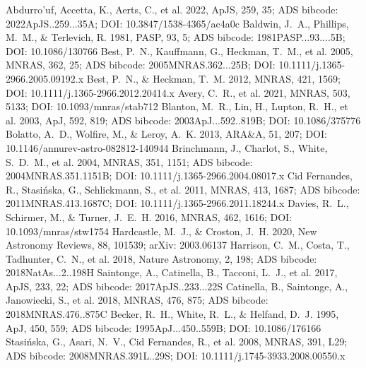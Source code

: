 \documentclass[twocolumn]{aastex631}
\begin{document}
\begin{thebibliography}{}
 Abdurro'uf, Accetta, K., Aerts, C., et al. 2022, ApJS, 259, 35; ADS bibcode: 2022ApJS..259...35A; DOI: 10.3847/1538-4365/ac4a0c
 Baldwin, J.~A., Phillips, M.~M., \& Terlevich, R. 1981, PASP, 93, 5; ADS bibcode: 1981PASP...93....5B; DOI: 10.1086/130766
 Best, P.~N., Kauffmann, G., Heckman, T.~M., et al. 2005, MNRAS, 362, 25; ADS bibcode: 2005MNRAS.362...25B; DOI: 10.1111/j.1365-2966.2005.09192.x
 Best, P.~N., \& Heckman, T.~M. 2012, MNRAS, 421, 1569; DOI: 10.1111/j.1365-2966.2012.20414.x
 Avery, C.~R., et al. 2021, MNRAS, 503, 5133; DOI: 10.1093/mnras/stab712
 Blanton, M.~R., Lin, H., Lupton, R.~H., et al. 2003, ApJ, 592, 819; ADS bibcode: 2003ApJ...592..819B; DOI: 10.1086/375776
 Bolatto, A.~D., Wolfire, M., \& Leroy, A.~K. 2013, ARA\&A, 51, 207; DOI: 10.1146/annurev-astro-082812-140944
 Brinchmann, J., Charlot, S., White, S.~D.~M., et al. 2004, MNRAS, 351, 1151; ADS bibcode: 2004MNRAS.351.1151B; DOI: 10.1111/j.1365-2966.2004.08017.x
 Cid Fernandes, R., Stasi{\'n}ska, G., Schlickmann, S., et al. 2011, MNRAS, 413, 1687; ADS bibcode: 2011MNRAS.413.1687C; DOI: 10.1111/j.1365-2966.2011.18244.x
 Davies, R.~L., Schirmer, M., \& Turner, J.~E.~H. 2016, MNRAS, 462, 1616; DOI: 10.1093/mnras/stw1754
 Hardcastle, M.~J., \& Croston, J.~H. 2020, New Astronomy Reviews, 88, 101539; arXiv: 2003.06137
 Harrison, C.~M., Costa, T., Tadhunter, C.~N., et al. 2018, Nature Astronomy, 2, 198; ADS bibcode: 2018NatAs...2..198H
 Saintonge, A., Catinella, B., Tacconi, L.~J., et al. 2017, ApJS, 233, 22; ADS bibcode: 2017ApJS..233...22S
 Catinella, B., Saintonge, A., Janowiecki, S., et al. 2018, MNRAS, 476, 875; ADS bibcode: 2018MNRAS.476..875C
 Becker, R.~H., White, R.~L., \& Helfand, D.~J. 1995, ApJ, 450, 559; ADS bibcode: 1995ApJ...450..559B; DOI: 10.1086/176166
 Stasi{\'n}ska, G., Asari, N.~V., Cid Fernandes, R., et al. 2008, MNRAS, 391, L29; ADS bibcode: 2008MNRAS.391L..29S; DOI: 10.1111/j.1745-3933.2008.00550.x

\end{thebibliography}
\end{document}

